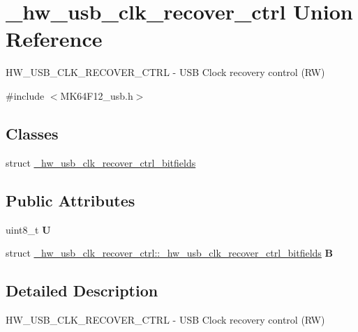 \hypertarget{union__hw__usb__clk__recover__ctrl}{}\section{\+\_\+hw\+\_\+usb\+\_\+clk\+\_\+recover\+\_\+ctrl Union Reference}
\label{union__hw__usb__clk__recover__ctrl}


H\+W\+\_\+\+U\+S\+B\+\_\+\+C\+L\+K\+\_\+\+R\+E\+C\+O\+V\+E\+R\+\_\+\+C\+T\+RL -\/ U\+SB Clock recovery control (RW)  




{\ttfamily \#include $<$M\+K64\+F12\+\_\+usb.\+h$>$}

\subsection*{Classes}
\begin{DoxyCompactItemize}
\item 
struct \hyperlink{struct__hw__usb__clk__recover__ctrl_1_1__hw__usb__clk__recover__ctrl__bitfields}{\+\_\+hw\+\_\+usb\+\_\+clk\+\_\+recover\+\_\+ctrl\+\_\+bitfields}
\end{DoxyCompactItemize}
\subsection*{Public Attributes}
\begin{DoxyCompactItemize}
\item 
uint8\+\_\+t {\bfseries U}\hypertarget{union__hw__usb__clk__recover__ctrl_acf43fefc1a5a5978e3cd175a390a66b7}{}\label{union__hw__usb__clk__recover__ctrl_acf43fefc1a5a5978e3cd175a390a66b7}

\item 
struct \hyperlink{struct__hw__usb__clk__recover__ctrl_1_1__hw__usb__clk__recover__ctrl__bitfields}{\+\_\+hw\+\_\+usb\+\_\+clk\+\_\+recover\+\_\+ctrl\+::\+\_\+hw\+\_\+usb\+\_\+clk\+\_\+recover\+\_\+ctrl\+\_\+bitfields} {\bfseries B}\hypertarget{union__hw__usb__clk__recover__ctrl_af7c85c7c3c68dbc25ee588e2e1b84d81}{}\label{union__hw__usb__clk__recover__ctrl_af7c85c7c3c68dbc25ee588e2e1b84d81}

\end{DoxyCompactItemize}


\subsection{Detailed Description}
H\+W\+\_\+\+U\+S\+B\+\_\+\+C\+L\+K\+\_\+\+R\+E\+C\+O\+V\+E\+R\+\_\+\+C\+T\+RL -\/ U\+SB Clock recovery control (RW) 


